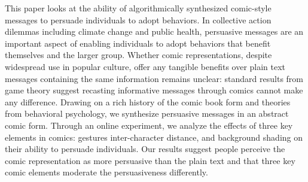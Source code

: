 
This paper looks at the ability of algorithmically synthesized comic-style messages to persuade individuals to adopt behaviors. In collective action dilemmas including climate change and public health, persuasive messages are an important aspect of enabling individuals to adopt behaviors that benefit themselves and the larger group. Whether comic representations, despite widespread use in popular culture, offer any tangible benefits over plain text messages containing the same information remains unclear: standard results from game theory suggest recasting informative messages through comics cannot make any difference. Drawing on a rich history of the comic book form and theories from behavioral psychology, we synthesize persuasive messages in an abstract comic form. Through an online experiment, we analyze the effects of three key elements in comics: gestures inter-character distance, and background shading on their ability to persuade individuals. Our results suggest  people perceive the comic representation as more persuasive than the plain text and that three key comic elements moderate the persuasiveness differently.
